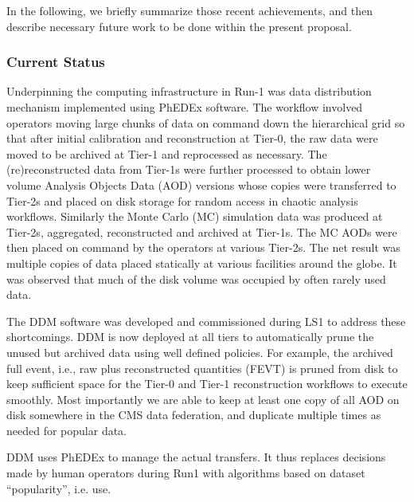 \documentclass[11pt,a4paper]{article}
\begin{document}
In the following, we briefly summarize those recent achievements, and then describe necessary future 
work to be done within the present proposal.

\subsubsection{Current Status}


Underpinning the computing infrastructure in Run-1 was data
distribution mechanism implemented using PhEDEx software. The workflow
involved operators moving large chunks of data on command down the
hierarchical grid so that after initial calibration and reconstruction
at Tier-0, the raw data were moved to be archived at Tier-1 and
reprocessed as necessary. The (re)reconstructed data from Tier-1s were
further processed to obtain lower volume Analysis Objects Data (AOD)
versions whose copies were transferred to Tier-2s and placed on disk
storage for random access in chaotic analysis workflows.  Similarly
the Monte Carlo (MC) simulation data was produced at Tier-2s,
aggregated, reconstructed and archived at Tier-1s. The MC AODs were
then placed on command by the operators at various Tier-2s. The net
result was multiple copies of data placed statically at various
facilities around the globe. It was observed that much of the disk
volume was occupied by often rarely used data.

The DDM software was developed and
commissioned during LS1 to address these shortcomings. DDM is now
deployed at all tiers to automatically prune the unused but archived
data using well defined policies.  For example, the archived full
event, i.e., raw plus reconstructed quantities (FEVT) is pruned from
disk to keep sufficient space for the Tier-0 and Tier-1 reconstruction
workflows to execute smoothly. Most importantly we are able to keep at
least one copy of all AOD on disk somewhere in the CMS data
federation, and duplicate multiple times as needed for popular data.

DDM uses PhEDEx to manage the actual transfers. It thus replaces decisions made by human operators during 
Run1 with algorithms based on dataset ``popularity'', i.e. use.

\end{document}
